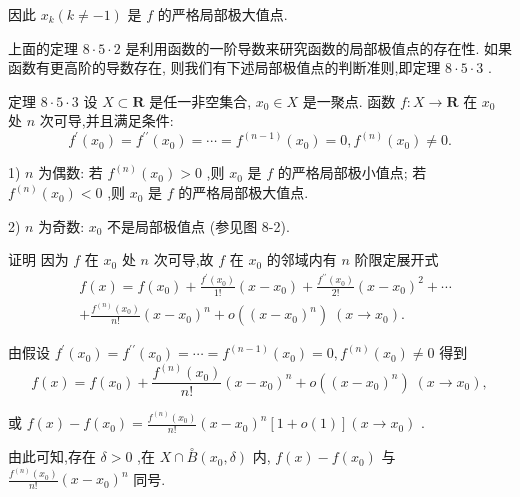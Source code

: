 因此 ${x}_{k}\left( {k \neq   - 1}\right)$ 是 $f$ 的严格局部极大值点.

上面的定理 $8 \cdot  5 \cdot  2$ 是利用函数的一阶导数来研究函数的局部极值点的存在性. 如果函数有更高阶的导数存在, 则我们有下述局部极值点的判断准则,即定理 $8 \cdot  5 \cdot  3$ .

定理 $8 \cdot  5 \cdot  3$ 设 $X \subset  \mathbf{R}$ 是任一非空集合, ${x}_{0} \in  X$ 是一聚点. 函数 $f : X \rightarrow  \mathbf{R}$ 在 ${x}_{0}$ 处 $n$ 次可导,并且满足条件:
$${f}^{\prime }\left( {x}_{0}\right)  = {f}^{\prime \prime }\left( {x}_{0}\right)  = \cdots  = {f}^{\left( n - 1\right) }\left( {x}_{0}\right)  = 0,{f}^{\left( n\right) }\left( {x}_{0}\right)  \neq  0.$$

1) $n$ 为偶数: 若 ${f}^{\left( n\right) }\left( {x}_{0}\right)  > 0$ ,则 ${x}_{0}$ 是 $f$ 的严格局部极小值点; 若 ${f}^{\left( n\right) }\left( {x}_{0}\right)  < 0$ ,则 ${x}_{0}$ 是 $f$ 的严格局部极大值点.

2) $n$ 为奇数: ${x}_{0}$ 不是局部极值点 (参见图 8-2).

证明 因为 $f$ 在 ${x}_{0}$ 处 $n$ 次可导,故 $f$ 在 ${x}_{0}$ 的邻域内有 $n$ 阶限定展开式
\begin{align*}
	&f\left( x\right)  = f\left( {x}_{0}\right)  + \frac{{f}^{\prime }\left( {x}_{0}\right) }{1!}\left( {x - {x}_{0}}\right)  + \frac{{f}^{\prime \prime }\left( {x}_{0}\right) }{2!}{\left( x - {x}_{0}\right) }^{2} + \cdots\\
	&+ \frac{{f}^{\left( n\right) }\left( {x}_{0}\right) }{n!}{\left( x - {x}_{0}\right) }^{n} + o\left( {\left( x - {x}_{0}\right) }^{n}\right) \;\left( {x \rightarrow  {x}_{0}}\right) .
\end{align*}

由假设 ${f}^{\prime }\left( {x}_{0}\right)  = {f}^{\prime \prime }\left( {x}_{0}\right)  = \cdots  = {f}^{\left( n - 1\right) }\left( {x}_{0}\right)  = 0,{f}^{\left( n\right) }\left( {x}_{0}\right)  \neq  0$ 得到
$$f\left( x\right)  = f\left( {x}_{0}\right)  + \frac{{f}^{\left( n\right) }\left( {x}_{0}\right) }{n!}{\left( x - {x}_{0}\right) }^{n} + o\left( {\left( x - {x}_{0}\right) }^{n}\right) \;\left( {x \rightarrow  {x}_{0}}\right) ,$$

或 $f\left( x\right)  - f\left( {x}_{0}\right)  = \frac{{f}^{\left( n\right) }\left( {x}_{0}\right) }{n!}{\left( x - {x}_{0}\right) }^{n}\left\lbrack  {1 + o\left( 1\right) }\right\rbrack  \left( {x \rightarrow  {x}_{0}}\right)$ .

由此可知,存在 $\delta  > 0$ ,在 $X \cap  \overset{ \circ  }{B}\left( {{x}_{0},\delta }\right)$ 内, $f\left( x\right)  - f\left( {x}_{0}\right)$ 与 $\frac{{f}^{\left( n\right) }\left( {x}_{0}\right) }{n!}{\left( x - {x}_{0}\right) }^{n}$ 同号.

